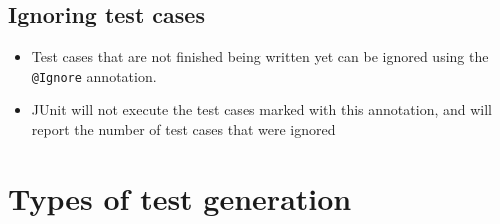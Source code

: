 \documentclass[12pt]{book}
\begin{document}
\subsection*{Ignoring test cases}
\begin{itemize}
    \item Test cases that are not finished being written yet can be ignored using the \texttt{@Ignore} annotation.
    \item JUnit will not execute the test cases marked with this annotation, and will report the number of test cases that were ignored
\end{itemize}

\section*{Types of test generation}
\end{document}
